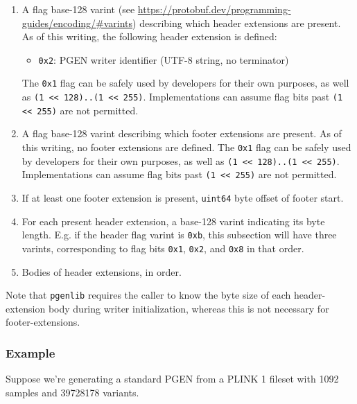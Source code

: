 \documentclass[8pt]{article}
\begin{document}
\begin{enumerate}
\item A flag base-128 varint (see
  \url{https://protobuf.dev/programming-guides/encoding/#varints}) describing
  which header extensions are present.  As of this writing, the following
  header extension is defined:
  \begin{itemize}
    \item \texttt{0x2}: PGEN writer identifier (UTF-8 string, no terminator)
  \end{itemize}
  The \texttt{0x1} flag can be safely used by developers for their own
  purposes, as well as \texttt{(1 << 128)..(1 << 255)}.  Implementations can
  assume flag bits past \texttt{(1 << 255)} are not permitted.
\item A flag base-128 varint describing which footer extensions are present.
  As of this writing, no footer extensions are defined.  The \texttt{0x1} flag
  can be safely used by developers for their own purposes, as well as
  \texttt{(1 << 128)..(1 << 255)}.  Implementations can assume flag bits past
  \texttt{(1 << 255)} are not permitted.
\item If at least one footer extension is present, \texttt{uint64} byte offset
  of footer start.
\item For each present header extension, a base-128 varint indicating its byte
  length.  E.g. if the header flag varint is \texttt{0xb}, this subsection will
  have three varints, corresponding to flag bits \texttt{0x1}, \texttt{0x2},
  and \texttt{0x8} in that order.
\item Bodies of header extensions, in order.
\end{enumerate}

Note that \texttt{pgenlib} requires the caller to know the byte size of each
header-extension body during writer initialization, whereas this is not
necessary for footer-extensions.

\subsubsection{Example}

Suppose we're generating a standard PGEN from a PLINK 1 fileset with 1092
samples and 39728178 variants.
\end{document}
